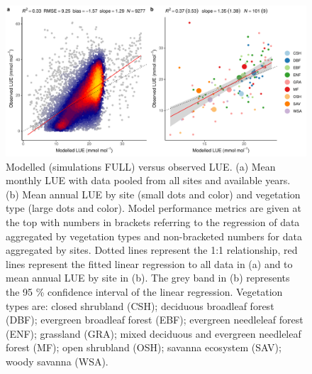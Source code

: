 \documentclass[gmd, manuscript]{copernicus}
\begin{document}
 \begin{figure}[t]
\includegraphics[width=12cm]{fig/modobs_lue.pdf}
    \caption{Modelled (simulations FULL) versus observed LUE. (a) Mean monthly LUE with data pooled from all sites and available years. (b) Mean annual LUE by site (small dots and color) and vegetation type (large dots and color). Model performance metrics are given at the top with numbers in brackets referring to the regression of data aggregated by vegetation types and non-bracketed numbers for data aggregated by sites. Dotted lines represent the 1:1 relationship, red lines represent the fitted linear regression to all data in (a) and to mean annual LUE by site in (b). The grey band in (b) represents the 95 \% confidence interval of the linear regression. Vegetation types are: closed shrubland (CSH); deciduous broadleaf forest (DBF); evergreen broadleaf forest (EBF); evergreen needleleaf forest (ENF); grassland (GRA); mixed deciduous and evergreen needleleaf forest (MF); open shrubland (OSH); savanna ecosystem (SAV); woody savanna (WSA). }
    \label{fig:lue}
\end{figure}



\end{document}
